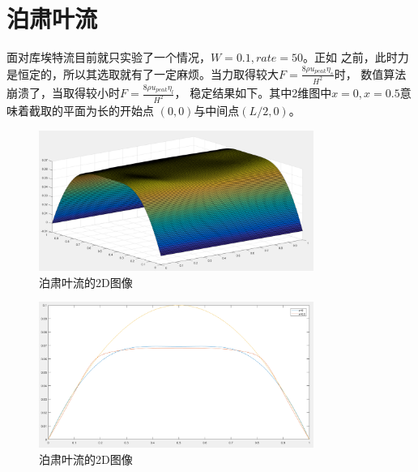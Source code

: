 \documentclass[11pt,UTF8]{ctexart}
\begin{document}
    \section{泊肃叶流}
    \par{面对库埃特流目前就只实验了一个情况，$W=0.1,rate=50$。正如
    之前，此时力是恒定的，所以其选取就有了一定麻烦。当力取得较大$F=\frac{8\rho u_{peak} \eta_s}{H^2}$时，
    数值算法崩溃了，当取得较小时$F=\frac{8\rho u_{peak} \eta_l}{H^2}$，
    稳定结果如下。其中2维图中$x=0,x=0.5$意味着截取的平面为长的开始点
    $(0,0)$与中间点$(L/2,0)$。}
    \begin{figure}[h]
        \centerline{\includegraphics[width=0.8\textwidth]{P_3D.png}}
        \caption{泊肃叶流的2D图像}
    \end{figure}
    \begin{figure}[h]
        \centerline{\includegraphics[width=0.8\textwidth]{P_2D.png}}
        \caption{泊肃叶流的2D图像}
    \end{figure}
\end{document}
